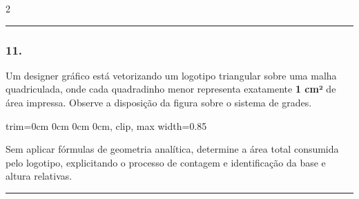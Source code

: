 \documentclass[twoside, 10pt, a4paper]{article}
\newlength{\espacoPreQuestao}\setlength{\espacoPreQuestao}{0.1cm}
\newlength{\espacoQuestao}\setlength{\espacoQuestao}{0.2cm}
\newcommand{\larguraTikz}{0.85\linewidth}
\begin{document}
\begin{multicols*}{2}
\noindent\textcolor{CorLinha}{\rule{\linewidth}{0.5pt}} 
\par\vspace{\espacoPreQuestao}
\subsubsection*{11.} Um designer gráfico está vetorizando um logotipo triangular sobre uma malha quadriculada, onde cada quadradinho menor representa exatamente \textbf{1 cm²} de área impressa. Observe a disposição da figura sobre o sistema de grades.

\begin{center}
\begin{adjustbox}{trim=0cm 0cm 0cm 0cm, clip, max width=\larguraTikz}
\end{adjustbox}
\end{center}

Sem aplicar fórmulas de geometria analítica, determine a área total consumida pelo logotipo, explicitando o processo de contagem e identificação da base e altura relativas.
\par\vspace{\espacoQuestao}

\noindent\textcolor{CorLinha}{\rule{\linewidth}{0.5pt}}
\par\vspace{\espacoPreQuestao}

\end{multicols*}
\end{document}

